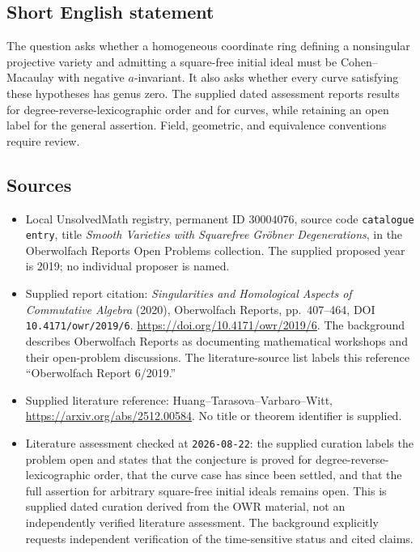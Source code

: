 \documentclass[11pt]{article}
\begin{document}
\subsection{Short English statement}
The question asks whether a homogeneous coordinate ring defining a nonsingular projective variety and admitting a square-free initial ideal must be Cohen--Macaulay with negative \(a\)-invariant. It also asks whether every curve satisfying these hypotheses has genus zero. The supplied dated assessment reports results for degree-reverse-lexicographic order and for curves, while retaining an open label for the general assertion. Field, geometric, and equivalence conventions require review.
\subsection{Sources}
\begin{itemize}
\item Local UnsolvedMath registry, permanent ID \(30004076\), source code \texttt{catalogue entry}, title \emph{Smooth Varieties with Squarefree Gr\"obner Degenerations}, in the Oberwolfach Reports Open Problems collection. The supplied proposed year is 2019; no individual proposer is named.
\item Supplied report citation: \emph{Singularities and Homological Aspects of Commutative Algebra} (2020), Oberwolfach Reports, pp.~407--464, DOI \texttt{10.4171/owr/2019/6}. \url{https://doi.org/10.4171/owr/2019/6}. The background describes Oberwolfach Reports as documenting mathematical workshops and their open-problem discussions. The literature-source list labels this reference ``Oberwolfach Report 6/2019.''
\item Supplied literature reference: Huang--Tarasova--Varbaro--Witt, \url{https://arxiv.org/abs/2512.00584}. No title or theorem identifier is supplied.
\item Literature assessment checked at \texttt{2026-08-22}: the supplied curation labels the problem open and states that the conjecture is proved for degree-reverse-lexicographic order, that the curve case has since been settled, and that the full assertion for arbitrary square-free initial ideals remains open. This is supplied dated curation derived from the OWR material, not an independently verified literature assessment. The background explicitly requests independent verification of the time-sensitive status and cited claims.
\end{itemize}
\end{document}
